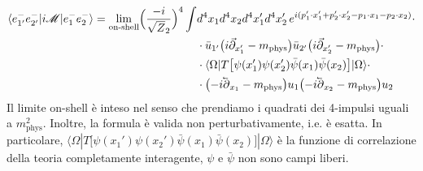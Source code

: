 \documentclass[../main.tex]{subfiles}
\begin{document}
    \begin{equation}
    \begin{aligned}
        \langle e^-_{1'}e^-_{2'}| i\mathscr{M} | e^-_1e^-_2 \rangle = \lim_\text{on-shell} \Bigl(\frac{-i}{\sqrt Z_2}\Bigr)^4\int &d^4x_1 d^4x_2 d^4x_1' d^4x_2' \, e^{i(p_1'\cdot x_1'+p_2'\cdot x_2' - p_1\cdot x_1 - p_2\cdot x_2)} \cdot\\
        & \cdot \bar u_{1'}\bigl(i\Vec{\partial}_{x_1'} - m_\text{phys}\bigr)\bar u_{2'}\bigl(i\Vec{\partial}_{x_2'} - m_\text{phys}\bigr)\cdot\\
        &\cdot \langle \Omega |T\bigl[ \psi(x_1')\psi(x_2')\bar\psi(x_1) \bar\psi(x_2) \bigr] | \Omega \rangle \cdot\\
        &\cdot \bigl(-i\cev{\partial}_{x_1} - m_\text{phys}\bigr)u_{1}\bigl(-i\cev{\partial}_{x_2} - m_\text{phys}\bigr)u_{2}
    \end{aligned}
    \label{eq:S_fi_LSZ}
    \end{equation}
Il limite on-shell è inteso nel senso che prendiamo i quadrati dei 4-impulsi uguali a $m_\text{phys}^2$.
Inoltre, la formula è valida non perturbativamente, i.e. è esatta.
In particolare, \(\langle \Omega |T\bigl[ \psi(x_1')\psi(x_2')\bar\psi(x_1) \bar\psi(x_2) \bigr] | \Omega \rangle \) è la funzione di correlazione della teoria completamente interagente, $\psi$ e $\bar\psi$ non sono campi liberi.
\end{document}
